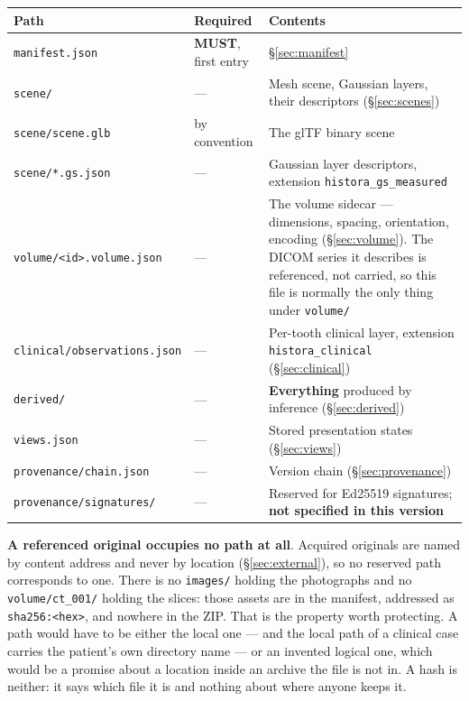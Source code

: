 \documentclass[11pt,a4paper]{article}
\newcommand{\MUST}{\textcolor{uosred}{\textbf{MUST}}}
\newcommand{\code}[1]{\texttt{\small #1}}
\begin{document}
\begin{longtable}{L{5.4cm} L{3.2cm} L{6.2cm}}
\toprule
\textbf{Path} & \textbf{Required} & \textbf{Contents}\\
\midrule
\endhead
\code{manifest.json} & \MUST, first entry & \S\ref{sec:manifest}\\
\code{scene/} & --- & Mesh scene, Gaussian layers, their descriptors (\S\ref{sec:scenes})\\
\code{scene/scene.glb} & by convention & The glTF binary scene\\
\code{scene/*.gs.json} & --- & Gaussian layer descriptors, extension
\code{histora\_gs\_measured}\\
\code{volume/<id>.volume.json} & --- & The volume sidecar --- dimensions, spacing,
orientation, encoding (\S\ref{sec:volume}). The DICOM series it describes is referenced,
not carried, so this file is normally the only thing under \code{volume/}\\
\code{clinical/observations.json} & --- & Per-tooth clinical layer, extension
\code{histora\_clinical} (\S\ref{sec:clinical})\\
\code{derived/} & --- & \textbf{Everything} produced by inference (\S\ref{sec:derived})\\
\code{views.json} & --- & Stored presentation states (\S\ref{sec:views})\\
\code{provenance/chain.json} & --- & Version chain (\S\ref{sec:provenance})\\
\code{provenance/signatures/} & --- & Reserved for Ed25519 signatures; \textbf{not
specified in this version}\\
\bottomrule
\end{longtable}

\textbf{A referenced original occupies no path at all}. 
Acquired originals are named by content address and never by location
(\S\ref{sec:external}), so no reserved path corresponds to one. There is no \code{images/}
holding the photographs and no \code{volume/ct\_001/} holding the slices: those assets are
in the manifest, addressed as \code{sha256:<hex>}, and nowhere in the ZIP. That is the property worth protecting. A path would have to be either the local one --- and
the local path of a clinical case carries the patient's own directory name --- or an invented
logical one, which would be a promise about a location inside an archive the file is not in.
A hash is neither: it says which file it is and nothing about where anyone keeps it.
\newline
\end{document}

